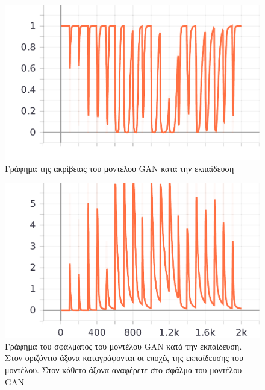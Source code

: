\begin{figure}[H]
  \centering
  \includegraphics{../images/graphs/epoch_accuracy.png}
  \caption{Γράφημα της ακρίβειας του μοντέλου GAN κατά την εκπαίδευση}
\end{figure}

\begin{figure}[H]
  \centering
  \includegraphics{../images/graphs/epoch_loss.png}
  \caption{Γράφημα του σφάλματος του μοντέλου GAN κατά την εκπαίδευση. Στον οριζόντιο άξονα καταγράφονται οι εποχές της εκπαίδευσης του μοντέλου. Στον κάθετο άξονα αναφέρετε στο σφάλμα του μοντέλου GAN}
\end{figure}

